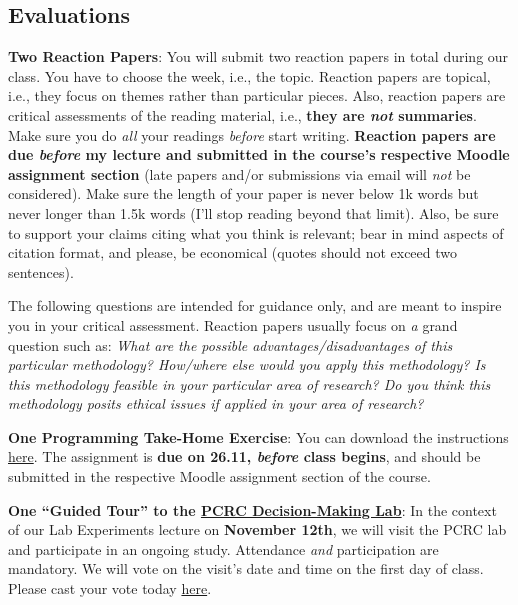 \documentclass[letterpaper]{article}
\renewenvironment{itemize}{
  \begin{list}{}{
    \setlength{\leftmargin}{1.5em}
  }
}{
  \end{list}
}
\begin{document}
\subsection*{Evaluations}

\begin{enumerate}
  \item {\bf Two Reaction Papers}: You will submit two reaction papers in total during our class. You have to choose the week, i.e., the topic. Reaction papers are topical, i.e., they focus on themes rather than particular pieces. Also, reaction papers are critical assessments of the reading material, i.e., {\bf they are \emph{not} summaries}. Make sure you do \emph{all} your readings \emph{before} start writing. {\bf Reaction papers are due \emph{before} my lecture and submitted in the course's respective Moodle assignment section} (late papers and/or submissions via email will \emph{not} be considered). Make sure the length of your paper is never below 1k words but never longer than 1.5k words (I'll stop reading beyond that limit). Also, be sure to support your claims citing what you think is relevant; bear in mind aspects of citation format, and please, be economical (quotes should not exceed two sentences).

  \begin{itemize}
  \item[\Pointinghand] The following questions are intended for guidance only, and are meant to inspire you in your critical assessment. Reaction papers usually focus on \emph{a} grand question such as: \emph{What are the possible advantages/disadvantages of this particular methodology? How/where else would you apply this methodology? Is this methodology feasible in your particular area of research? Do you think this methodology posits ethical issues if applied in your area of research?}
\end{itemize}

\item {\bf One Programming Take-Home Exercise}: You can download the instructions \href{https://github.com/hbahamonde/Exp_Soc_Science/raw/main/Lectures/Labs/Conjoint/Conjoint_Lab.pdf}{here}. The assignment is {\bf due on 26.11, \emph{before} class begins}, and should be submitted in the respective Moodle assignment section of the course.

\item {\bf One ``Guided Tour'' to the \href{https://pcrclab.utu.fi/?page_id=894&lang=en}{PCRC Decision-Making Lab}}: In the context of our Lab Experiments lecture on {\bf November 12th}, we will visit the PCRC lab and participate in an ongoing study. Attendance \emph{and} participation are mandatory. We will vote on the visit's date and time on the first day of class. Please cast your vote today \href{https://doodle.com/meeting/participate/id/b62JzOVb}{here}.

  


\end{enumerate}
\end{document}
